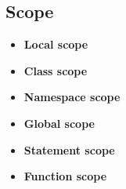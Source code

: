\documentclass[11pt,a4paper]{book}
\begin{document}
\subsection{Scope}
\begin{itemize}
	\item \textbf{Local scope}
	\item \textbf{Class scope}
	\item \textbf{Namespace scope}
	\item \textbf{Global scope}
	\item \textbf{Statement scope}
	\item \textbf{Function scope}
\end{itemize}
\end{document}
